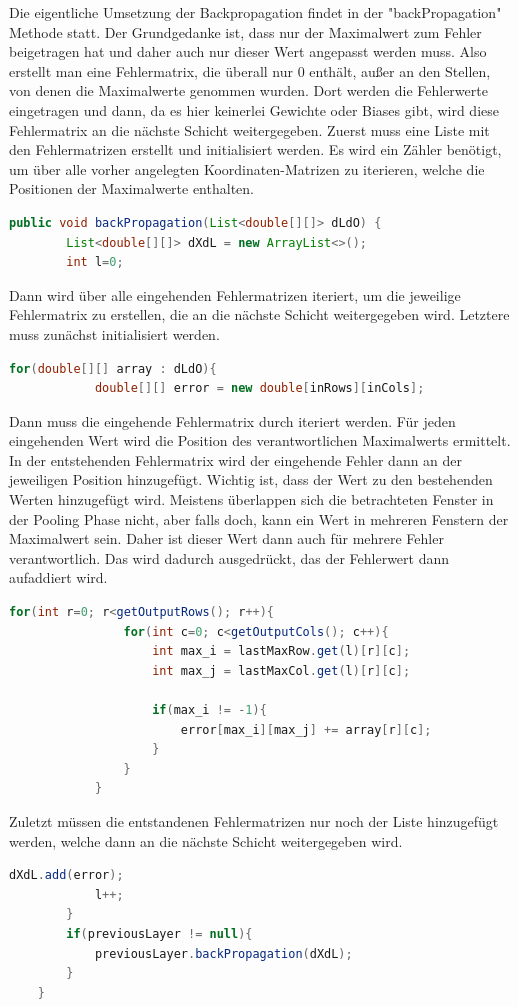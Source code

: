 \documentclass[12pt]{article}
\begin{document}
Die eigentliche Umsetzung der Backpropagation findet in der "backPropagation" Methode statt. Der Grundgedanke ist, dass nur der Maximalwert zum Fehler beigetragen hat und daher auch nur dieser Wert angepasst werden muss. Also erstellt man eine Fehlermatrix, die überall nur 0 enthält, außer an den Stellen, von denen die Maximalwerte genommen wurden. Dort werden die Fehlerwerte eingetragen und dann, da es hier keinerlei Gewichte oder Biases gibt, wird diese Fehlermatrix an die nächste Schicht weitergegeben.
Zuerst muss eine Liste mit den Fehlermatrizen erstellt und initialisiert werden. Es wird ein Zähler benötigt, um über alle vorher angelegten Koordinaten-Matrizen zu iterieren, welche die Positionen der Maximalwerte enthalten.
\begin{lstlisting}[language=Java]
    public void backPropagation(List<double[][]> dLdO) {
        List<double[][]> dXdL = new ArrayList<>();
        int l=0;
\end{lstlisting}
Dann wird über alle eingehenden Fehlermatrizen iteriert, um die jeweilige Fehlermatrix zu erstellen, die an die nächste Schicht weitergegeben wird. Letztere muss zunächst initialisiert werden.  
\begin{lstlisting}[language=Java]
        for(double[][] array : dLdO){
            double[][] error = new double[inRows][inCols];
\end{lstlisting}
Dann muss die eingehende Fehlermatrix durch iteriert werden. Für jeden eingehenden Wert wird die Position des verantwortlichen Maximalwerts ermittelt. In der entstehenden Fehlermatrix wird der eingehende Fehler dann an der jeweiligen Position hinzugefügt. Wichtig ist, dass der Wert zu den bestehenden Werten hinzugefügt wird. 
Meistens überlappen sich die betrachteten Fenster in der Pooling Phase nicht, aber falls doch, kann ein Wert in mehreren Fenstern der Maximalwert sein. 
Daher ist dieser Wert dann auch für mehrere Fehler verantwortlich. Das wird dadurch ausgedrückt, das der Fehlerwert dann aufaddiert wird.
\begin{lstlisting}[language=Java]
            for(int r=0; r<getOutputRows(); r++){
                for(int c=0; c<getOutputCols(); c++){
                    int max_i = lastMaxRow.get(l)[r][c];
                    int max_j = lastMaxCol.get(l)[r][c];

                    if(max_i != -1){
                        error[max_i][max_j] += array[r][c];
                    }
                }
            }
\end{lstlisting}
Zuletzt müssen die entstandenen Fehlermatrizen nur noch der Liste hinzugefügt werden, welche dann an die nächste Schicht weitergegeben wird.  
\begin{lstlisting}[language=Java]
            dXdL.add(error);
            l++;
        }
        if(previousLayer != null){
            previousLayer.backPropagation(dXdL);
        }
    }
\end{lstlisting}
\end{document}
